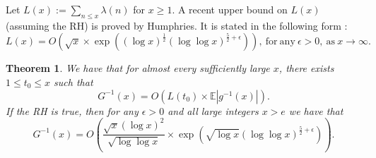 \documentclass[11pt,reqno,a4letter]{article}
\numberwithin{figure}{section}
\numberwithin{table}{section}
\theoremstyle{plain}
\newtheorem{theorem}{Theorem}
\numberwithin{theorem}{section}
\theoremstyle{definition}
\begin{document}
Let $L(x) := \sum_{n \leq x} \lambda(n)$ for $x \geq 1$. 
A recent upper bound on $L(x)$ (assuming the RH) is proved by Humphries. It is 
stated in the following form \cite{HUMPHRIES-JNT-2013}: 
\begin{equation} 
\label{eqn_LxBigOhAsymptotics_Humphries_v1}
L(x) = O\left(\sqrt{x} \times \exp\left( (\log x)^{\frac{1}{2}} 
     (\log\log x)^{\frac{5}{2} + \epsilon}\right)\right), 
     \mathrm{\ for\ any\ } \epsilon > 0, 
     \mathrm{\ as\ } x \rightarrow \infty.
\end{equation}

\begin{theorem} 
\label{cor_ExprForGInvxByLx_v1} 
We have that for almost every sufficiently large $x$, there exists $1 \leq t_0 \leq x$ such that 
$$G^{-1}(x) = O\left(L(t_0) \times \mathbb{E}|g^{-1}(x)|\right).$$ 
If the RH is true, then 
for any $\epsilon > 0$ and all large integers $x > e$ we have that 
\[
G^{-1}(x) = O\left(\frac{\sqrt{x} (\log x)^2}{\sqrt{\log\log x}} \times \exp\left( 
     \sqrt{\log x} (\log\log x)^{\frac{5}{2} + \epsilon}\right)\right). 
\]
\end{theorem} 
\end{document}
